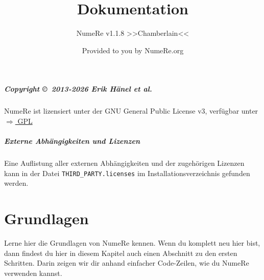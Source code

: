 \documentclass[DIV=17, parskip=half]{scrreprt}
\title{Dokumentation}
\subtitle{NumeRe v1.1.8 >>Chamberlain<<}
\date{}
\author{\small Provided to you by NumeRe.org}
\begin{document}
    \maketitle
% 
% 
	\tableofcontents
		\paragraph{Copyright \copyright\ 2013-2026 Erik H\"anel \emph{et al.}} 
		NumeRe ist lizensiert unter der GNU General Public License v3, verf\"ugbar unter \href{http://www.gnu.org/licenses/gpl.html}{$\Rightarrow$ GPL}
		\paragraph{Externe Abh\"angigkeiten und Lizenzen} Eine Auflistung aller externen Abh\"angigkeiten und der zugeh\"origen Lizenzen kann in der Datei \verb!THIRD_PARTY.licenses! im Installationsverzeichnis gefunden werden.
	\chapter{Grundlagen}
		Lerne hier die Grundlagen von NumeRe kennen. Wenn du komplett neu hier bist, dann findest du hier in diesem Kapitel auch einen Abschnitt zu den ersten Schritten. Darin zeigen wir dir anhand einfacher Code-Zeilen, wie du NumeRe verwenden kannst.
		
		
		
		
		
		
		
		
		
		
	
\end{document}
